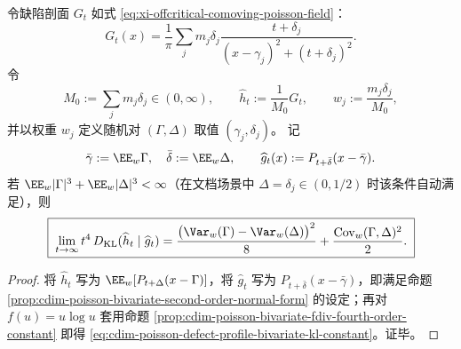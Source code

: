\begin{proposition}\label{prop:cdim-poisson-defect-profile-bivariate-kl-constant}
令缺陷剖面 \(G_t\) 如式 \eqref{eq:xi-offcritical-comoving-poisson-field}：
\[
G_t(x)=\frac{1}{\pi}\sum_j m_j\delta_j\frac{t+\delta_j}{(x-\gamma_j)^2+(t+\delta_j)^2}.
\]
令
\[
M_0:=\sum_j m_j\delta_j\in(0,\infty),
\qquad
\widehat h_t:=\frac{1}{M_0}G_t,
\qquad
w_j:=\frac{m_j\delta_j}{M_0},
\]
并以权重 \(w_j\) 定义随机对 \((\Gamma,\Delta)\) 取值 \((\gamma_j,\delta_j)\)。
记
\[
\bar\gamma:=\EE_w\Gamma,\quad \bar\delta:=\EE_w\Delta,
\qquad
\widehat g_t(x):=P_{t+\bar\delta}(x-\bar\gamma).
\]
若 \(\EE_w|\Gamma|^3+\EE_w|\Delta|^3<\infty\)（在文档场景中 \(\Delta=\delta_j\in(0,1/2)\) 时该条件自动满足），则
\begin{equation}\label{eq:cdim-poisson-defect-profile-bivariate-kl-constant}
\boxed{\;
\lim_{t\to\infty}t^4\,D_{\mathrm{KL}}(\widehat h_t\mid \widehat g_t)
=
\frac{\bigl(\Var_w(\Gamma)-\Var_w(\Delta)\bigr)^2}{8}
+\frac{\mathrm{Cov}_w(\Gamma,\Delta)^2}{2}.\;}
\end{equation}
\end{proposition}
\begin{proof}
将 \(\widehat h_t\) 写为 \(\EE_w[P_{t+\Delta}(x-\Gamma)]\)，将 \(\widehat g_t\) 写为 \(P_{t+\bar\delta}(x-\bar\gamma)\)，即满足命题 \ref{prop:cdim-poisson-bivariate-second-order-normal-form} 的设定；再对 \(f(u)=u\log u\) 套用命题 \ref{prop:cdim-poisson-bivariate-fdiv-fourth-order-constant} 即得 \eqref{eq:cdim-poisson-defect-profile-bivariate-kl-constant}。证毕。
\end{proof}

\endinput

